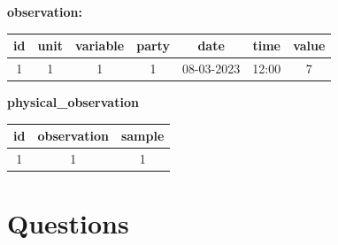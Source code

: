 \documentclass{exam}
\begin{document}
\begin{questions}
\begin{parts}
		\begin{center}
			\textbf{observation:}

			\begin{tabular}{ | c | c | c | c | c | c | c |}
				\hline
				id & unit & variable & party & date       & time  & value \\
				\hline
				1  & 1    & 1        & 1     & 08-03-2023 & 12:00 & 7     \\
				\hline
			\end{tabular}

			\textbf{physical\_observation}

			\begin{tabular}{ | c | c | c | }
				\hline
				id & observation & sample \\
				\hline
				1  & 1           & 1      \\
				\hline
			\end{tabular}
		\end{center}
	\end{parts}
	\pagebreak
\end{questions}

\section{Questions}
\begin{questions}
	\question
\end{questions}
\end{document}
